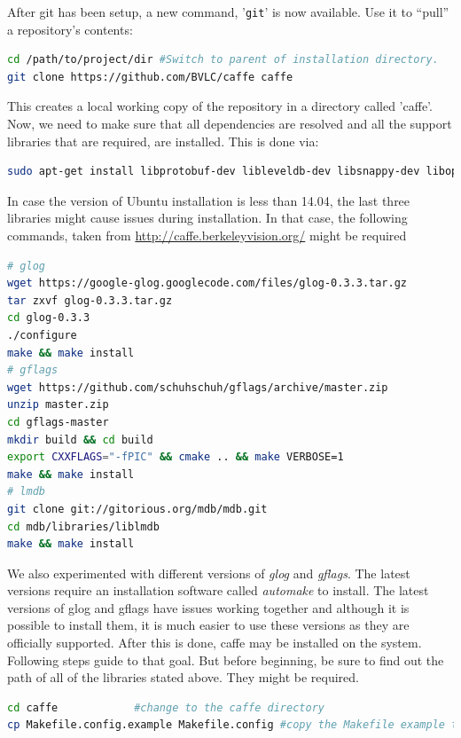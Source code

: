 \documentclass{article}
\begin{document}
After git has been setup, a new command, '\texttt{git}' is now available. Use it to \enquote{pull} a repository's contents:
\begin{lstlisting}[tabsize=4,language=bash,breaklines]
cd /path/to/project/dir #Switch to parent of installation directory.
git clone https://github.com/BVLC/caffe caffe
\end{lstlisting}
This creates a local working copy of the repository in a directory called 'caffe'. Now, we need to make sure that all dependencies are resolved and all the support libraries that are required, are installed. This is done via:
\begin{lstlisting}[tabsize=4,language=bash,breaklines=true]
sudo apt-get install libprotobuf-dev libleveldb-dev libsnappy-dev libopencv-dev libboost-all-dev libhdf5-serial-dev libgflags-dev libatlas-base-dev python-devel libgoogle-glog-dev liblmdb-dev protobuf-compiler
\end{lstlisting}
In case the version of Ubuntu installation is less than 14.04, the last three libraries might cause issues during installation. In that case, the following commands, taken from \url{http://caffe.berkeleyvision.org/} might be required 
\begin{lstlisting}[tabsize=4,language=bash,breaklines]
# glog
wget https://google-glog.googlecode.com/files/glog-0.3.3.tar.gz
tar zxvf glog-0.3.3.tar.gz
cd glog-0.3.3
./configure
make && make install
# gflags
wget https://github.com/schuhschuh/gflags/archive/master.zip
unzip master.zip
cd gflags-master
mkdir build && cd build
export CXXFLAGS="-fPIC" && cmake .. && make VERBOSE=1
make && make install
# lmdb
git clone git://gitorious.org/mdb/mdb.git
cd mdb/libraries/liblmdb
make && make install
\end{lstlisting}

We also experimented with different versions of \emph{glog} and \emph{gflags}. The latest versions require an installation software called \emph{automake} to install. The latest versions of glog and gflags have issues working together and although it is possible to install them, it is much easier to use these versions as they are officially supported. After this is done, caffe may be installed on the system. Following steps guide to that goal. But before beginning, be sure to find out the path of all of the libraries stated above. They might be required.
\begin{lstlisting}[tabsize=4,language=bash,breaklines=true]
cd caffe 			#change to the caffe directory
cp Makefile.config.example Makefile.config #copy the Makefile example to the actual Makefile
\end{lstlisting}
\end{document}
